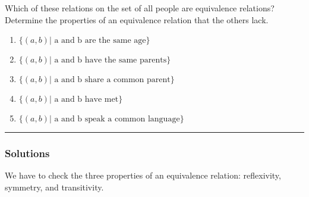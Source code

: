 \newpage

\newcommand{\abset}[1]{$\{(a, b) | \text{~#1}\}$}

\begin{question}
Which of these relations on the set of all people are equivalence relations? Determine the properties of an equivalence relation that the others lack.

\begin{enumerate}
    \item \abset{a and b are the same age}
    \item \abset{a and b have the same parents}
    \item \abset{a and b share a common parent}
    \item \abset{a and b have met}
    \item \abset{a and b speak a common language}
\end{enumerate}

\end{question}

\par\noindent\rule{\textwidth}{0.5pt}

\subsubsection*{Solutions}

We have to check the three properties of an equivalence relation: reflexivity, symmetry, and transitivity.

